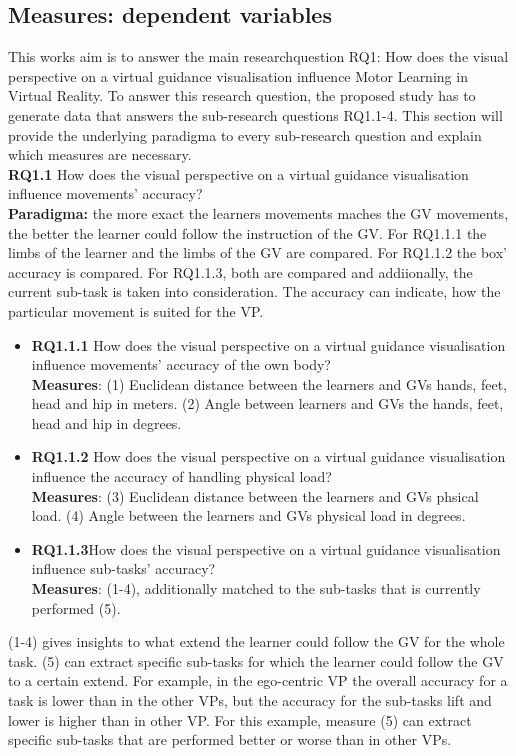 \subsection{Measures: dependent variables}
This works aim is to answer the main researchquestion RQ1: How does the visual perspective on a virtual guidance visualisation influence Motor Learning in Virtual Reality. To answer this research question, the proposed study has to generate data that answers the sub-research questions RQ1.1-4. This section will provide the underlying paradigma to every sub-research question and explain which measures are necessary.\\

\textbf{RQ1.1} How does the visual perspective on a virtual guidance visualisation influence movements' accuracy?\\
\textbf{Paradigma:} the more exact the learners movements maches the GV movements, the better the learner could follow the instruction of the GV. For RQ1.1.1 the limbs of the learner and the limbs of the GV are compared. For RQ1.1.2 the box' accuracy is compared. For RQ1.1.3, both are compared and addiionally, the current sub-task is taken into consideration. The accuracy can indicate, how the particular movement is suited for the VP.
\begin{itemize}
	\item[] \textbf{RQ1.1.1} How does the visual perspective on a virtual guidance visualisation influence movements' accuracy of the own body?\\
	\textbf{Measures}: (1) Euclidean distance between the learners and GVs hands, feet, head and hip in meters. (2) Angle between learners and GVs the hands, feet, head and hip in degrees.

	\item[] \textbf{RQ1.1.2} How does the visual perspective on a virtual guidance visualisation influence the accuracy of handling physical load?\\
	\textbf{Measures}: (3) Euclidean distance between the learners and GVs phsical load. (4) Angle between the learners and GVs physical load in degrees.

	\item[] \textbf{RQ1.1.3}How does the visual perspective on a virtual guidance visualisation influence sub-tasks' accuracy?\\
	\textbf{Measures}: (1-4), additionally matched to the sub-tasks that is currently performed (5).
\end{itemize}	
(1-4) gives insights to what extend the learner could follow the GV for the whole task. (5) can extract specific sub-tasks for which the learner could follow the GV to a certain extend. For example, in the ego-centric VP the overall accuracy for a task is lower than in the other VPs, but the accuracy for the sub-tasks lift and lower is higher than in other VP. For this example, measure (5) can extract specific sub-tasks that are performed better or worse than in other VPs.\\

